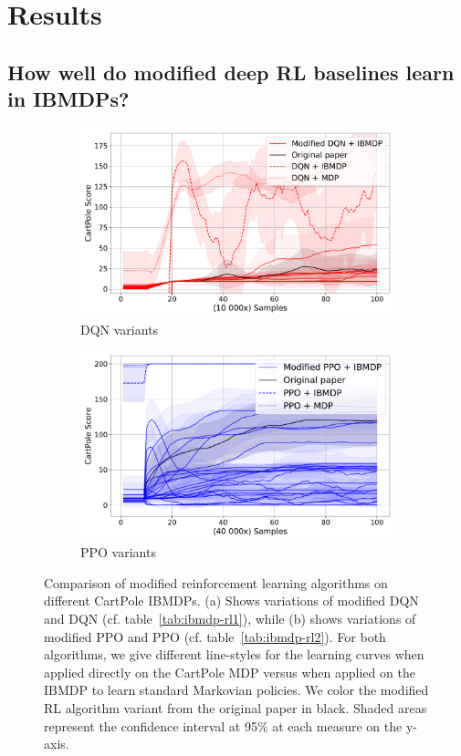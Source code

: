 \section{Results}

\subsection{How well do modified deep RL baselines learn in IBMDPs?}

\begin{figure}
    \centering
    \begin{subfigure}[b]{0.49\textwidth}
        \centering
        \includegraphics[width=\textwidth]{images/images_part1/dqn.pdf}
        \caption{DQN variants}\label{fig:res-dqn}
    \end{subfigure}
    \hfill
    \begin{subfigure}[b]{0.49\textwidth}
        \centering
        \includegraphics[width=\textwidth]{images/images_part1/ppo.pdf}
        \caption{PPO variants}\label{fig:res-ppo}
    \end{subfigure}
    \caption{Comparison of modified reinforcement learning algorithms on different CartPole IBMDPs. (a) Shows variations of modified DQN and DQN (cf. table~\ref{tab:ibmdp-rl1}), while (b) shows variations of modified PPO and PPO (cf. table~\ref{tab:ibmdp-rl2}). For both algorithms, we give different line-styles for the learning curves when applied directly on the CartPole MDP versus when applied on the IBMDP to learn standard Markovian policies. We color the modified RL algorithm variant from the original paper in black. Shaded areas represent the confidence interval at 95\% at each measure on the y-axis.}
\end{figure}

